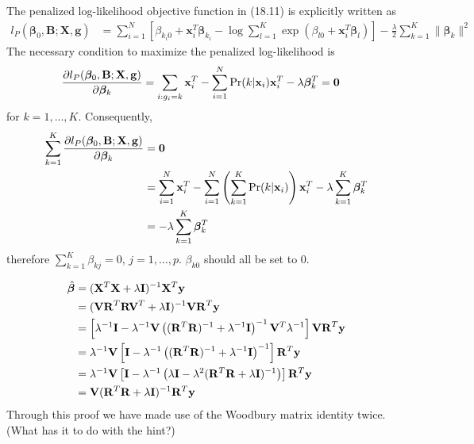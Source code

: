 \begin{exercise}
  The penalized log-likelihood objective function in (18.11) is explicitly
  written as
  \begin{align}
    l_P(\bm{\beta}_0, \mathbf{B}; \mathbf{X}, \mathbf{g}) &= \sum_{i=1}^N 
    \left[\beta_{k_i0} + \mathbf{x}_i^T\bm{\beta}_{k_i} - \log \sum_{l=1}^K 
    \exp(\beta_{l0} + \mathbf{x}_i^T\bm{\beta}_l) \right] - \frac{\lambda}{2}
    \sum_{k=1}^K\|\bm{\beta}_k\|^2
  \end{align}
  The necessary condition to maximize the penalized log-likelihood is
  \begin{align}
    \pdv{l_P(\bm{\beta}_0, \mathbf{B}; \mathbf{X}, \mathbf{g})}{\bm{\beta}_k} &=
    \sum_{i:g_i=k}\mathbf{x}_i^T - \sum_{i=1}^N\mbox{Pr}(k|\mathbf{x}_i)
    \mathbf{x}_i^T - \lambda\bm{\beta}_k^T = \mathbf{0}
  \end{align}
  for $k=1,\ldots,K$. Consequently,
  \begin{align}
    \sum_{k=1}^K  \pdv{l_P(\bm{\beta}_0, \mathbf{B}; \mathbf{X},
    \mathbf{g})}{\bm{\beta}_k} &= \mathbf{0} \notag \\
    &= \sum_{i=1}^N\mathbf{x}_i^T - \sum_{i=1}^N \left(\sum_{k=1}^K
    \mbox{Pr}(k|\mathbf{x}_i)\right)\mathbf{x}_i^T - \lambda
    \sum_{k=1}^K\bm{\beta}_k^T \notag \\
    &=  - \lambda \sum_{k=1}^K\bm{\beta}_k^T
  \end{align}
  therefore $\sum_{k=1}^K\beta_{kj} = 0$, $j=1,\ldots,p$. $\beta_{k0}$ should
  all be set to 0.
\end{exercise}

\begin{exercise}
  \begin{align}
    \hat{\bm{\beta}} &= (\mathbf{X}^T\mathbf{X} + \lambda \mathbf{I})^{-1}
    \mathbf{X}^T \mathbf{y} \notag \\
    &= (\mathbf{VR}^T\mathbf{RV}^T + \lambda \mathbf{I})^{-1}\mathbf{VR}^T
    \mathbf{y} \notag \\
    &= \left[\lambda^{-1}\mathbf{I} - \lambda^{-1}\mathbf{V}
    \left((\mathbf{R}^T\mathbf{R})^{-1} + \lambda^{-1}\mathbf{I}
    \right)^{-1}\mathbf{V}^T \lambda^{-1}\right] \mathbf{VR}^T\mathbf{y}
    \notag\\
    & = \lambda^{-1}\mathbf{V} \left[\mathbf{I} - \lambda^{-1}
    \left((\mathbf{R}^T\mathbf{R})^{-1} + \lambda^{-1}\mathbf{I} \right)^{-1}
    \right]\mathbf{R}^T\mathbf{y} \notag\\
    &= \lambda^{-1}\mathbf{V} \left[\mathbf{I} - \lambda^{-1}
    \left(\lambda\mathbf{I} - \lambda^2(\mathbf{R}^T\mathbf{R} +
    \lambda\mathbf{I})^{-1} \right) \right]\mathbf{R}^T\mathbf{y} \notag \\
    &= \mathbf{V} (\mathbf{R}^T\mathbf{R} +
    \lambda\mathbf{I})^{-1} \mathbf{R}^T\mathbf{y}
  \end{align}
  Through this proof we have made use of the Woodbury matrix identity twice.
  (What has it to do with the hint?)
\end{exercise}

